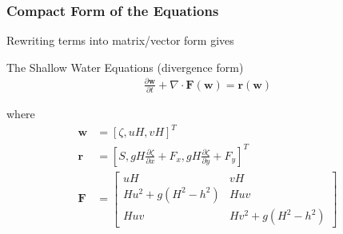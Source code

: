 \documentclass[10pt]{beamer}
\newcommand\dt[1]{\frac{\partial #1}{\partial t}}
\newcommand\dx[1]{\frac{\partial #1}{\partial x}}
\newcommand\dy[1]{\frac{\partial #1}{\partial y}}
\begin{document}
\begin{frame}
  \frametitle{Compact Form of the Equations}
  Rewriting terms into matrix/vector form  gives
  \begin{block}{The Shallow Water Equations (divergence form)}
    \begin{align*}
    \dt{\mathbf{w}} + \nabla \cdot \mathbf{F}(\mathbf{w}) = \mathbf{r}(\mathbf{w})
    \end{align*}
  \end{block}
  where
  \begin{align*}
    \mathbf{w} &= [\zeta, uH, vH]^T \\
    \mathbf{r} &= [S, gH\dx{\zeta} + F_x, gH\dy{\zeta} + F_y]^T \\
    \mathbf{F} &=
                 \begin{bmatrix}
                   uH & vH \\
                   Hu^2 + g(H^2-h^2) & Huv \\
                   Huv & Hv^2 + g(H^2-h^2)
                 \end{bmatrix}
  \end{align*}
\end{frame}
\end{document}
